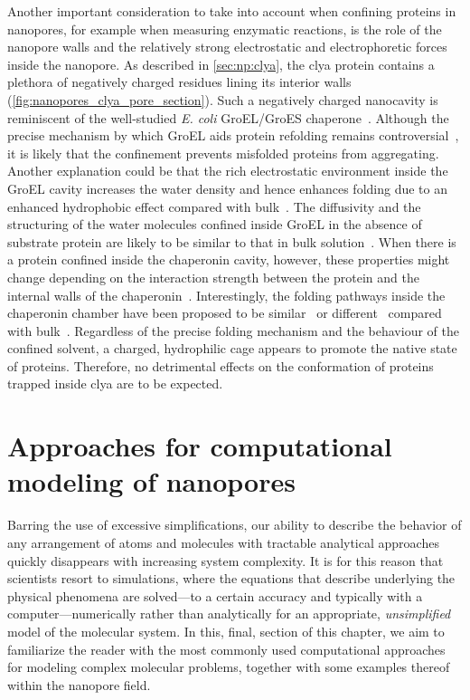 Another important consideration to take into account when confining proteins in nanopores, for example when
measuring enzymatic reactions, is the role of the nanopore walls and the relatively strong electrostatic and
electrophoretic forces inside the nanopore. As described in \cref{sec:np:clya}, the \gls{clya} protein
contains a plethora of negatively charged residues lining its interior walls
(\cref{fig:nanopores_clya_pore_section}). Such a negatively charged nanocavity is reminiscent of the
well-studied \textit{E. coli} {GroEL/GroES} chaperone~\cite{Xu-1997}. Although the precise mechanism by which
{GroEL} aids protein refolding remains
controversial~\cite{England-2008,England-2008b,Motojima-2012,Weber-2013}, it is likely that the confinement
prevents misfolded proteins from aggregating. Another explanation could be that the rich electrostatic
environment inside the {GroEL} cavity increases the water density and hence enhances folding due to an
enhanced hydrophobic effect compared with bulk~\cite{England-2008,England-2008b}. The diffusivity and the
structuring of the water molecules confined inside {GroEL} in the absence of substrate protein are likely to
be similar to that in bulk solution~\cite{Franck-2014}. When there is a protein confined inside the chaperonin
cavity, however, these properties might change depending on the interaction strength between the protein and
the internal walls of the chaperonin~\cite{Weber-2013}. Interestingly, the folding pathways inside the
chaperonin chamber have been proposed to be similar~\cite{Horst-2007} or different~\cite{Jewett-2004} compared
with bulk~\cite{Apetri-2008}. Regardless of the precise folding mechanism and the behaviour of the confined
solvent, a charged, hydrophilic cage appears to promote the native state of proteins. Therefore, no
detrimental effects on the conformation of proteins trapped inside \gls{clya} are to be expected.


%
%
%
%


\section{Approaches for computational modeling of nanopores}
%
\label{sec:np:modeling}
%

Barring the use of excessive simplifications, our ability to describe the behavior of any arrangement of atoms
and molecules with tractable analytical approaches quickly disappears with increasing system complexity. It is
for this reason that scientists resort to simulations, where the equations that describe underlying the
physical phenomena are solved---to a certain accuracy and typically with a computer---numerically rather than
analytically for an appropriate, \emph{unsimplified} model of the molecular system. In this, final, section of
this chapter, we aim to familiarize the reader with the most commonly used computational approaches for
modeling complex molecular problems, together with some examples thereof within the nanopore field.

